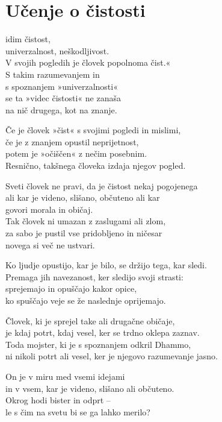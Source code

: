 \cleartorecto
{}
\chapter{Učenje o čistosti}

idim čistost,\\ univerzalnost, neškodljivost.\\
V svojih pogledih je človek popolnoma čist.«\\
S takim razumevanjem in\\\vin s spoznanjem »univerzalnosti«\\
se ta »videc čistosti« ne zanaša\\\vin na nič drugega, kot na znanje.

Če je človek »čist« s svojimi pogledi in mislimi,\\
če je z znanjem opustil neprijetnost,\\
potem je »očiščen« z nečim posebnim.\\
Resnično, takšnega človeka izdaja njegov pogled.

\clearpage

Sveti človek ne pravi, da je čistost nekaj pogojenega\\
ali kar je videno, slišano, občuteno ali kar\\\vin govori morala in običaj.\\
Tak človek ni umazan z zaslugami ali zlom,\\
za sabo je pustil vse pridobljeno in ničesar\\\vin novega si več ne ustvari.

Ko ljudje opustijo, kar je bilo, se držijo tega, kar sledi.\\
Premaga jih navezanost, ker sledijo svoji strasti:\\
sprejemajo in opuščajo kakor opice,\\
ko spuščajo veje se že naslednje oprijemajo.

Človek, ki je sprejel take ali drugačne običaje,\\
je kdaj potrt, kdaj vesel, ker se trdno oklepa zaznav.\\
Toda mojster, ki je s spoznanjem odkril Dhammo,\\
ni nikoli potrt ali vesel, ker je njegovo razumevanje jasno.

On je v miru med vsemi idejami\\
in v vsem, kar je videno, slišano ali občuteno.\\
Okrog hodi bister in odprt --\\
le s čim na svetu bi se ga lahko merilo?

